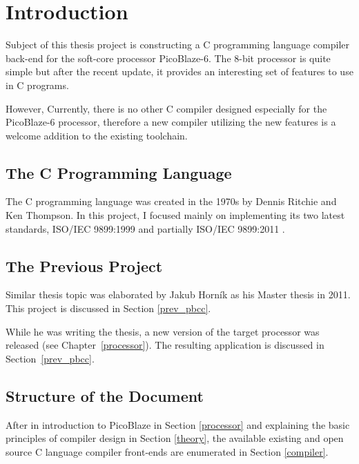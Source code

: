 
\newcommand{\todo}[1]{\textcolor{red}{TODO\:} \textcolor{gray}{#1}}

\chapter{Introduction}\label{introduction}

Subject of this thesis project is constructing a C programming language compiler back-end for the soft-core processor PicoBlaze-6. The 8-bit processor is quite simple but after the recent update, it provides an interesting set of features to use in C programs.

However, Currently, there is no other C compiler designed especially for the PicoBlaze-6 processor, therefore a new compiler utilizing the new features is a welcome addition to the existing toolchain.

    \section{The C Programming Language}

    The C programming language was created in the 1970s by Dennis Ritchie and Ken Thompson. In this project, I focused mainly on implementing its two latest standards, ISO/IEC 9899:1999 \cite{C99} and partially ISO/IEC 9899:2011 \cite{C11}.

    \section{The Previous Project}
    Similar thesis topic was elaborated by Jakub Horník as his Master thesis in 2011. This project is discussed in Section \ref{prev_pbcc}.

    While he was writing the thesis, a new version of the target processor was released (see Chapter~\ref{processor}). The resulting application is discussed in Section~\ref{prev_pbcc}.

    \section{Structure of the Document}

    After in introduction to PicoBlaze in Section \ref{processor} and explaining the basic principles of compiler design in Section \ref{theory}, the available existing and open source C language compiler front-ends are enumerated in Section \ref{compiler}.

